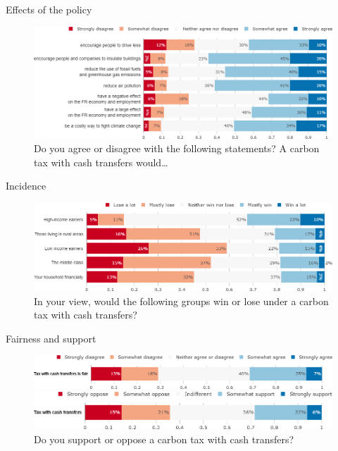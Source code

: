 \begin{framefont}{\small}
\begin{frame}{Effects of the policy}
\begin{figure}[h!]
\centering
\caption{Do you agree or disagree with the following statements? A carbon tax with cash transfers would…}
\includegraphics[width=.87\paperwidth]{../figures/FR/tax_transfers_effect_FR.png}
\end{figure}
\end{frame}

\begin{frame}{Incidence}%
\begin{figure}[h!]
\centering
\caption{In your view, would the following groups win or lose under a carbon tax with cash transfers?}
\includegraphics[width=.87\paperwidth]{../figures/FR/tax_transfers_win_lose_FR.png}
\end{figure}
\end{frame}

\begin{frame}{Fairness and support}%
\begin{figure}[h!]
\centering
\caption{Do you agree or disagree with the following statement: ``A carbon tax with cash transfers is fair."}
\includegraphics[width=.87\paperwidth]{../figures/FR/tax_transfers_fair_FR.png}
\vspace{.5cm}
\centering
\caption{Do you support or oppose a carbon tax with cash transfers?}
\includegraphics[width=.87\paperwidth]{../figures/FR/tax_transfers_support_FR.png}
\end{figure}


\end{frame}
\end{framefont}
